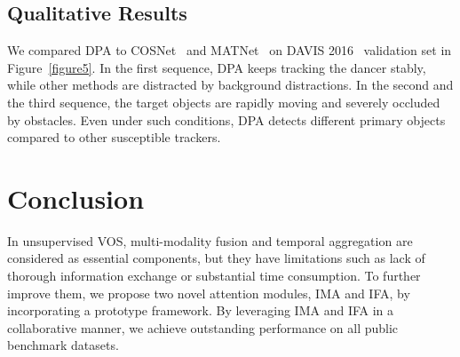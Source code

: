 \documentclass[10pt,twocolumn,letterpaper]{article}
\begin{document}
\subsection{Qualitative Results}
\label{quali}
We compared DPA to COSNet~\cite{COSNet} and MATNet~\cite{MATNet} on DAVIS 2016~\cite{DAVIS} validation set in Figure~\ref{figure5}. In the first sequence, DPA keeps tracking the dancer stably, while other methods are distracted by background distractions. In the second and the third sequence, the target objects are rapidly moving and severely occluded by obstacles. Even under such conditions, DPA detects different primary objects compared to other susceptible trackers. 



\section{Conclusion}
In unsupervised VOS, multi-modality fusion and temporal aggregation are considered as essential components, but they have limitations such as lack of thorough information exchange or substantial time consumption. To further improve them, we propose two novel attention modules, IMA and IFA, by incorporating a prototype framework. By leveraging IMA and IFA in a collaborative manner, we achieve outstanding performance on all public benchmark datasets.






{\small


}
\end{document}
